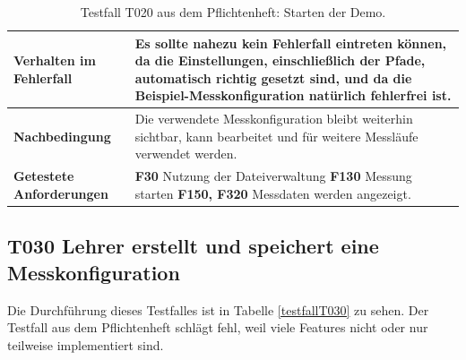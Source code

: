 \documentclass[parskip=full]{scrartcl}
\begin{document}
\begin{table}[h]
\begin{tabular}{| p{4cm} | p{10cm} |}
		\textbf{Verhalten im Fehlerfall}
		& 
		Es sollte nahezu kein Fehlerfall eintreten können,
		da die Einstellungen, einschließlich der Pfade, automatisch richtig gesetzt sind, und da die 
		Beispiel-Messkonfiguration natürlich fehlerfrei ist.
		\\ \hline
		
		\textbf{Nachbedingung}
		& 
		Die verwendete Messkonfiguration bleibt weiterhin 
		sichtbar, kann bearbeitet und für weitere Messläufe verwendet werden. 
		\\ \hline
		
		
		\textbf{Getestete Anforderungen}
		& 
		\textbf{F30} Nutzung der Dateiverwaltung \textbf{F130} Messung starten \textbf{F150, F320} Messdaten werden angezeigt.
		\\ \hline
		
		
		
	\end{tabular}
	\caption{Testfall T020 aus dem Pflichtenheft: Starten der Demo.}
	\label{testfallT020}
\end{table}

\subsection{\textbf{T030} Lehrer erstellt und speichert eine Messkonfiguration}
Die Durchführung dieses Testfalles ist in Tabelle \ref{testfallT030} zu sehen. Der Testfall aus dem Pflichtenheft schlägt fehl, weil viele Features nicht oder nur teilweise implementiert sind.
\end{document}
